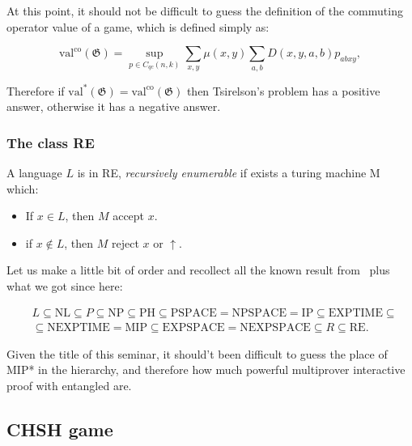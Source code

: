 At this point, it should not be difficult to guess the definition of the commuting operator value of a game, which is defined simply as:

\begin{defn}
    \begin{equation}
    \operatorname{val^\text{co}}(\mathfrak{G})=\sup _{p \in C_{q c}(n, k)} \sum_{x, y} \mu(x, y) \sum_{a, b} D(x, y, a, b) p_{a b x y},
    \end{equation}
\end{defn}

Therefore if $\operatorname{val^{*}}(\mathfrak{G}) = \operatorname{val^\text{co}}(\mathfrak{G})$ then Tsirelson's problem has a positive answer, otherwise it has a negative answer.


\subsubsection{The class RE}

\begin{defn}
A language $L$ is in RE, \emph{recursively enumerable} if exists a turing machine M which:
\begin{itemize}
\item If $x \in L$, then $M$ accept $x$.
\item if $x \notin L$, then $M$ reject $x$ or $\uparrow$.
\end{itemize}
\end{defn}

Let us make a little bit of order and recollect all the known result from~\cite{papadimitriou1994computational} plus what we got since here:

\begin{equation}
\begin{split}
    &L \subseteq \text{NL} \subseteq P \subseteq \text{NP} \subseteq \text{PH} \subseteq \text{PSPACE} = \text{NPSPACE} = \text{IP} \subseteq \text{EXPTIME} \subseteq  \\
    &\subseteq \text{NEXPTIME} = \text{MIP} \subseteq \text{EXPSPACE} = \text{NEXPSPACE} \subseteq R \subseteq \text{RE}.
\end{split}
\end{equation}

Given the title of this seminar, it should't been difficult to guess the place of MIP* in the hierarchy, and therefore how much powerful multiprover interactive proof with entangled are.

\subsection{CHSH game}
